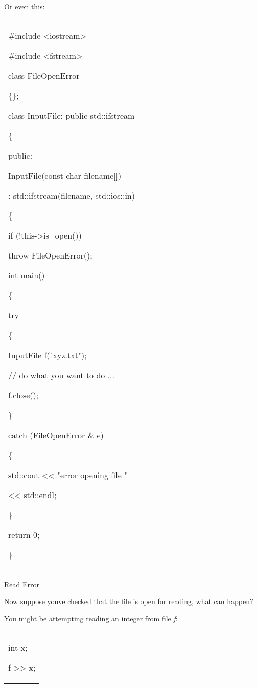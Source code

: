 \documentclass[
]{article}
\begin{document}
Or even this:

\begin{longtable}[]{@{}
  >{\raggedright\arraybackslash}p{}@{}}
\toprule\noalign{}
 \\
\midrule\noalign{}
\endhead
\bottomrule\noalign{}
\endlastfoot
\#include \textless iostream\textgreater{}

\#include \textless fstream\textgreater{}

class FileOpenError

\{\};

class InputFile: public std::ifstream

\{

public:

InputFile(const char filename{[}{]})

: std::ifstream(filename, std::ios::in)

\{

if (!this-\textgreater is\_open())

throw FileOpenError();

\vtop{\hbox{\strut  \}}\hbox{\strut \};}}

int main()

\{

try

\{

InputFile f("xyz.txt");

// do what you want to do ...

f.close();

\}

catch (FileOpenError \& e)

\{

std::cout \textless\textless{} "error opening file "

\textless\textless{} std::endl;

\}

return 0;

\} \\
\end{longtable}

Read Error

Now suppose you\textquotesingle ve checked that the file is open for
reading, what can happen?

You might be attempting reading an integer from file \emph{f}:

\begin{longtable}[]{@{}
  >{\raggedright\arraybackslash}p{}@{}}
\toprule\noalign{}
 \\
\midrule\noalign{}
\endhead
\bottomrule\noalign{}
\endlastfoot
int x;

f \textgreater\textgreater{} x; \\
\end{longtable}
\end{document}
